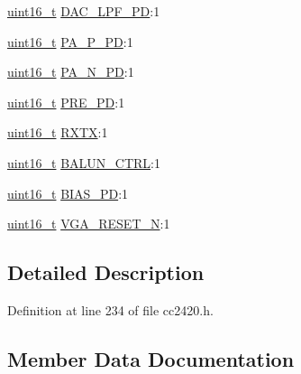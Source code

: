 \begin{DoxyCompactItemize}
\item 
\hyperlink{_p_e___types_8h_a1f1825b69244eb3ad2c7165ddc99c956}{uint16\+\_\+t} \hyperlink{structcc2420___m_a_n_a_n_d__reg__t_abfb5b21532ab9c261a87fd78fd0fd41d}{D\+A\+C\+\_\+\+L\+P\+F\+\_\+\+PD}\+:1
\item 
\hyperlink{_p_e___types_8h_a1f1825b69244eb3ad2c7165ddc99c956}{uint16\+\_\+t} \hyperlink{structcc2420___m_a_n_a_n_d__reg__t_ae7d1195f464036ad4cb4283869a71cc8}{P\+A\+\_\+\+P\+\_\+\+PD}\+:1
\item 
\hyperlink{_p_e___types_8h_a1f1825b69244eb3ad2c7165ddc99c956}{uint16\+\_\+t} \hyperlink{structcc2420___m_a_n_a_n_d__reg__t_ae3fd300ff05e214ce701e32e6152f1ec}{P\+A\+\_\+\+N\+\_\+\+PD}\+:1
\item 
\hyperlink{_p_e___types_8h_a1f1825b69244eb3ad2c7165ddc99c956}{uint16\+\_\+t} \hyperlink{structcc2420___m_a_n_a_n_d__reg__t_ad8d4ebe646c2348b30f19a74caa767b5}{P\+R\+E\+\_\+\+PD}\+:1
\item 
\hyperlink{_p_e___types_8h_a1f1825b69244eb3ad2c7165ddc99c956}{uint16\+\_\+t} \hyperlink{structcc2420___m_a_n_a_n_d__reg__t_ae50794cce4e9539a2faab9ddd02f1366}{R\+X\+TX}\+:1
\item 
\hyperlink{_p_e___types_8h_a1f1825b69244eb3ad2c7165ddc99c956}{uint16\+\_\+t} \hyperlink{structcc2420___m_a_n_a_n_d__reg__t_abd422c9830b44afb8ef05dde123ce911}{B\+A\+L\+U\+N\+\_\+\+C\+T\+RL}\+:1
\item 
\hyperlink{_p_e___types_8h_a1f1825b69244eb3ad2c7165ddc99c956}{uint16\+\_\+t} \hyperlink{structcc2420___m_a_n_a_n_d__reg__t_a644a58424afe5f293ccc60fc7269b91a}{B\+I\+A\+S\+\_\+\+PD}\+:1
\item 
\hyperlink{_p_e___types_8h_a1f1825b69244eb3ad2c7165ddc99c956}{uint16\+\_\+t} \hyperlink{structcc2420___m_a_n_a_n_d__reg__t_a0e6e1f0dc3a8e79220df7745f472cc9f}{V\+G\+A\+\_\+\+R\+E\+S\+E\+T\+\_\+N}\+:1
\end{DoxyCompactItemize}


\subsection{Detailed Description}


Definition at line 234 of file cc2420.\+h.



\subsection{Member Data Documentation}
